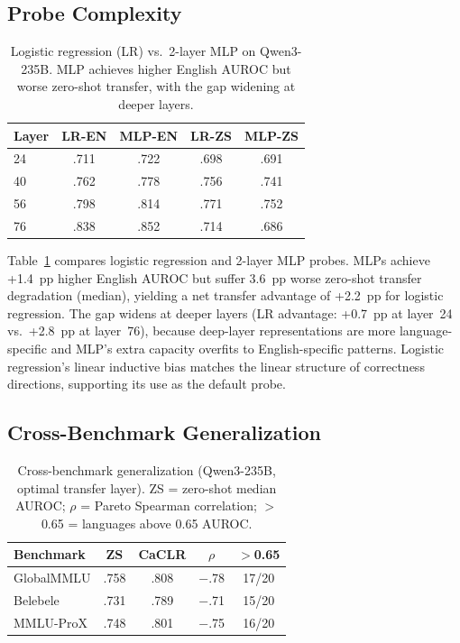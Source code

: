 \documentclass[11pt,a4paper]{article}
\begin{document}
\subsection{Probe Complexity}
\label{sec:exp:probe}

\begin{table}[t]
\centering
\small
\begin{tabular}{@{}lcccc@{}}
\toprule
\textbf{Layer} & \textbf{LR-EN} & \textbf{MLP-EN} & \textbf{LR-ZS} & \textbf{MLP-ZS} \\
\midrule
24 & .711 & .722 & .698 & .691 \\
40 & .762 & .778 & .756 & .741 \\
56 & .798 & .814 & .771 & .752 \\
76 & .838 & .852 & .714 & .686 \\
\bottomrule
\end{tabular}
\caption{Logistic regression (LR) vs.\ 2-layer MLP on Qwen3-235B. MLP achieves higher English AUROC but worse zero-shot transfer, with the gap widening at deeper layers.}
\label{tab:probe}
\end{table}

Table~\ref{tab:probe} compares logistic regression and 2-layer MLP probes.
MLPs achieve +1.4~pp higher English AUROC but suffer 3.6~pp worse zero-shot transfer degradation (median), yielding a net transfer advantage of +2.2~pp for logistic regression.
The gap widens at deeper layers (LR advantage: +0.7~pp at layer~24 vs.\ +2.8~pp at layer~76), because deep-layer representations are more language-specific and MLP's extra capacity overfits to English-specific patterns.
Logistic regression's linear inductive bias matches the linear structure of correctness directions, supporting its use as the default probe.

\subsection{Cross-Benchmark Generalization}
\label{sec:exp:benchmark}

\begin{table}[t]
\centering
\small
\begin{tabular}{@{}lcccc@{}}
\toprule
\textbf{Benchmark} & \textbf{ZS} & \textbf{CaCLR} & $\rho$ & \textbf{$>$0.65} \\
\midrule
GlobalMMLU & .758 & .808 & $-$.78 & 17/20 \\
Belebele & .731 & .789 & $-$.71 & 15/20 \\
MMLU-ProX & .748 & .801 & $-$.75 & 16/20 \\
\bottomrule
\end{tabular}
\caption{Cross-benchmark generalization (Qwen3-235B, optimal transfer layer). ZS = zero-shot median AUROC; $\rho$ = Pareto Spearman correlation; $>$0.65 = languages above 0.65 AUROC.}
\label{tab:benchmark}
\end{table}
\end{document}
